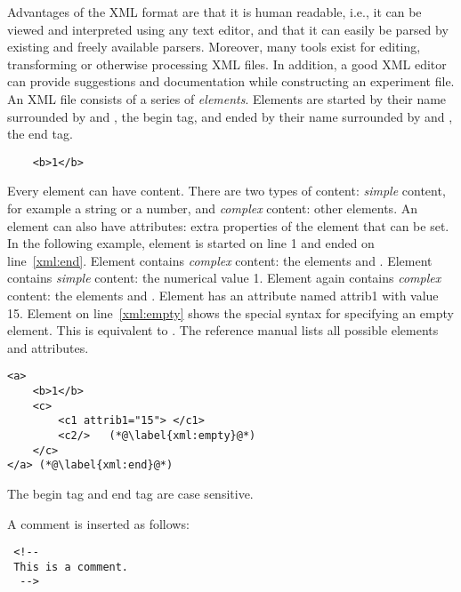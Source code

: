 
Advantages of the XML format are that it is human readable, i.e.,
it can be viewed and interpreted using any text editor, and that
it can easily be parsed by existing and freely available
parsers. Moreover, many
tools exist for editing, transforming or otherwise processing XML
files. In addition, a good XML editor can provide suggestions and
documentation while constructing an experiment file. An XML file
consists of a series of \emph{elements}. Elements are started by
their name surrounded by \xml{<} and \xml{>}, the begin tag, and
ended by their name surrounded by \xml{</} and \xml{>}, the end
tag.
\begin{lstlisting}
    <b>1</b>
\end{lstlisting}


Every element can have content. There are two types of content:
\emph{simple} content, for example a string or a number, and
\emph{complex} content: other elements. An element can also have
attributes: extra properties of the element that can be set.
 In the following example, element  is started
on line 1 and ended on line~\ref{xml:end}. Element 
contains \emph{complex} content: the elements  and
. Element  contains \emph{simple} content:
the numerical value 1. Element  again contains
\emph{complex} content: the elements  and
. Element  has an attribute named attrib1
with value 15. Element  on line~\ref{xml:empty} shows
the special syntax for specifying an empty element. This is
equivalent to . The reference manual lists all
possible elements and attributes.

\begin{lstlisting}
<a>
    <b>1</b>
    <c>
        <c1 attrib1="15"> </c1>
        <c2/>   (*@\label{xml:empty}@*)
    </c>
</a> (*@\label{xml:end}@*)
\end{lstlisting}

The begin tag and end tag are case sensitive.

A comment is
inserted as follows:
\begin{lstlisting}
 <!--
 This is a comment.
  -->
\end{lstlisting}



